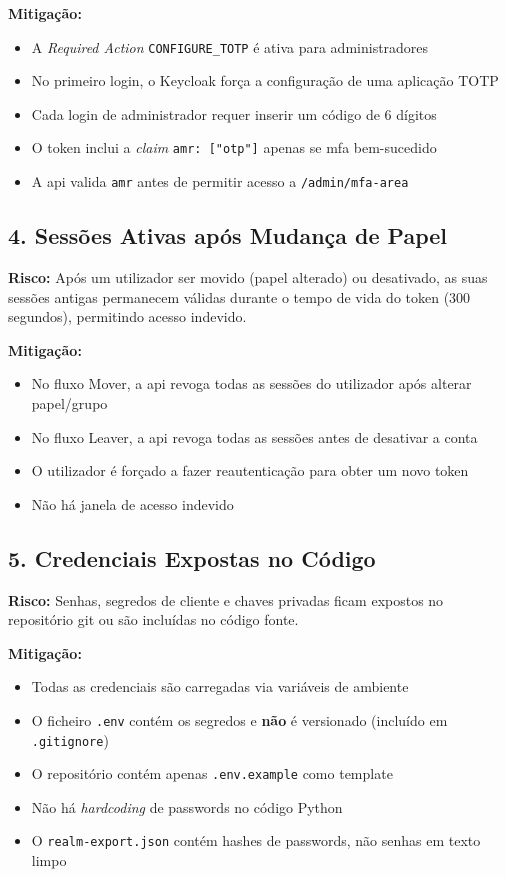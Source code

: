 \textbf{Mitigação:}
\begin{itemize}
  \item A \textit{Required Action} \texttt{CONFIGURE\_TOTP} é ativa para administradores
  \item No primeiro login, o Keycloak força a configuração de uma aplicação TOTP
  \item Cada login de administrador requer inserir um código de 6 dígitos
  \item O token inclui a \textit{claim} \texttt{amr: ["otp"]} apenas se \gls{mfa} bem-sucedido
  \item A \gls{api} valida \texttt{amr} antes de permitir acesso a \texttt{/admin/mfa-area}
\end{itemize}

\subsection{4. Sessões Ativas após Mudança de Papel}

\textbf{Risco:} Após um utilizador ser movido (papel alterado) ou desativado, as suas sessões antigas permanecem válidas durante o tempo de vida do token (300 segundos), permitindo acesso indevido.

\textbf{Mitigação:}
\begin{itemize}
  \item No fluxo Mover, a \gls{api} revoga todas as sessões do utilizador após alterar papel/grupo
  \item No fluxo Leaver, a \gls{api} revoga todas as sessões antes de desativar a conta
  \item O utilizador é forçado a fazer reautenticação para obter um novo token
  \item Não há janela de acesso indevido
\end{itemize}

\subsection{5. Credenciais Expostas no Código}

\textbf{Risco:} Senhas, segredos de cliente e chaves privadas ficam expostos no repositório git ou são incluídas no código fonte.

\textbf{Mitigação:}
\begin{itemize}
  \item Todas as credenciais são carregadas via variáveis de ambiente
  \item O ficheiro \texttt{.env} contém os segredos e \textbf{não} é versionado (incluído em \texttt{.gitignore})
  \item O repositório contém apenas \texttt{.env.example} como template
  \item Não há \textit{hardcoding} de passwords no código Python
  \item O \texttt{realm-export.json} contém hashes de passwords, não senhas em texto limpo
\end{itemize}

